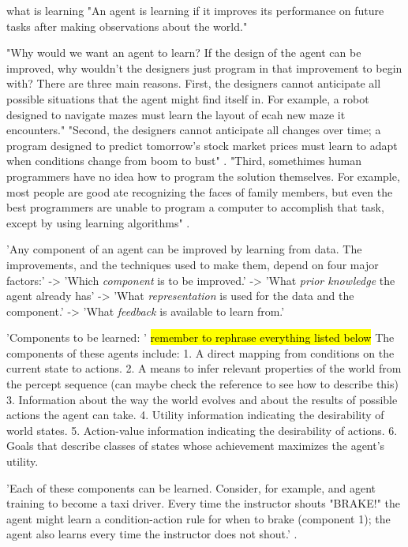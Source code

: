 what is learning
"An agent is learning if it improves its performance on future tasks after making observations about the world." \cite{russell2016artificial}

"Why would we want an agent to learn? If the design of the agent can be improved, why wouldn't the designers just program in that improvement to begin with? There are three main reasons. First, the designers cannot anticipate all possible situations that the agent might find itself in. For example, a robot designed to navigate mazes must learn the layout of ecah new maze it encounters." \cite{russell2016artificial}
"Second, the designers cannot anticipate all changes over time; a program designed to predict tomorrow's stock market prices must learn to adapt when conditions change from boom to bust" \cite{russell2016artificial}.
"Third, somethimes human programmers have no idea how to program the solution themselves. For example, most people are good ate recognizing the faces of family members, but even the best programmers are unable to program a computer to accomplish that task, except by using learning algorithms" \cite{russell2016artificial}.

'Any component of an agent can be improved by learning from data. The improvements, and the techniques used to make them, depend on four major factors:'
-> 'Which \textit{component} is to be improved.'
-> 'What \textit{prior knowledge} the agent already has'
-> 'What \textit{representation} is used for the data and the component.'
-> 'What \textit{feedback} is available to learn from.'


'Components to be learned: ' \cite{russell2016artificial} \hl{remember to rephrase everything listed below}
The components of these agents include:
1. A direct mapping from conditions on the current state to actions.
2. A means to infer relevant properties of the world from the percept sequence (can maybe check the reference to see how to describe this)
3. Information about the way the world evolves and about the results of possible actions the agent can take.
4. Utility information indicating the desirability of world states.
5. Action-value information indicating the desirability of actions.
6. Goals that describe classes of states whose achievement maximizes the agent's utility.

'Each of these components can be learned. Consider, for example, and agent training to become a taxi driver. Every time the instructor shouts "BRAKE!" the agent might learn a condition-action rule for when to brake (component 1); the agent also learns every time the instructor does not shout.' \cite{russell2016artificial}.

